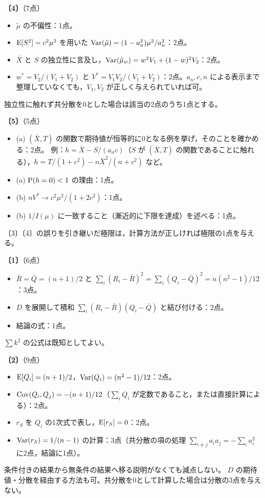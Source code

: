 \documentclass[a4paper,11pt]{ltjsarticle}
\renewcommand{\ans}[1]{\par\medskip\noindent\textbf{〔#1〕}\quad}
\renewcommand{\points}[1]{\hfill\textnormal{（#1点）}\par\nobreak}
\begin{document}
\ans{4}\points{7}
\begin{itemize}
\item $\tilde\mu$ の不偏性：1点。
\item $\operatorname{E}[S^2]=c^2\mu^2$ を用いた $\operatorname{Var}(\tilde\mu)=(1-a_n^2)\mu^2/a_n^2$：2点。
\item $\bar X$ と $S$ の独立性に言及し，$\operatorname{Var}(\hat\mu_w)=w^2V_1+(1-w)^2V_2$：2点。
\item $w^*=V_2/(V_1+V_2)$ と $V^*=V_1V_2/(V_1+V_2)$：2点。$a_n,c,n$ による表示まで整理していなくても，$V_1,V_2$ が正しく与えられていれば可。
\end{itemize}
独立性に触れず共分散を0とした場合は該当の2点のうち1点とする。

\ans{5}\points{5}
\begin{itemize}
\item (a) $(\bar X,T)$ の関数で期待値が恒等的に0となる例を挙げ，そのことを確かめる：2点。
例：$h=\bar X-S/(a_nc)$（$S$ が $(\bar X,T)$ の関数であることに触れる），$h=T/(1+c^2)-n\bar X^2/(n+c^2)$ など。
\item (a) $\operatorname{P}(h=0)<1$ の理由：1点。
\item (b) $nV^*\to c^2\mu^2/(1+2c^2)$：1点。
\item (b) $1/I(\mu)$ に一致すること（漸近的に下限を達成）を述べる：1点。
\end{itemize}
〔3〕〔4〕の誤りを引き継いだ極限は，計算方法が正しければ極限の1点を与える。
\newpage

\ans{1}\points{6}
\begin{itemize}
\item $\bar R=\bar Q=(n+1)/2$ と $\sum_i(R_i-\bar R)^2=\sum_i(Q_i-\bar Q)^2=n(n^2-1)/12$：3点。
\item $D$ を展開して積和 $\sum_i(R_i-\bar R)(Q_i-\bar Q)$ と結び付ける：2点。
\item 結論の式：1点。
\end{itemize}
$\sum k^2$ の公式は既知としてよい。

\ans{2}\points{9}
\begin{itemize}
\item $\operatorname{E}[Q_i]=(n+1)/2$，$\operatorname{Var}(Q_i)=(n^2-1)/12$：2点。
\item $\operatorname{Cov}(Q_i,Q_j)=-(n+1)/12$（$\sum_iQ_i$ が定数であること，または直接計算による）：2点。
\item $r_S$ を $Q_i$ の1次式で表し，$\operatorname{E}[r_S]=0$：2点。
\item $\operatorname{Var}(r_S)=1/(n-1)$ の計算：3点（共分散の項の処理 $\sum_{i\ne j}a_ia_j=-\sum_ia_i^2$ に2点，結論に1点）。
\end{itemize}
条件付きの結果から無条件の結果へ移る説明がなくても減点しない。
$D$ の期待値・分散を経由する方法も可。共分散を0として計算した場合は分散の3点を与えない。
\end{document}
